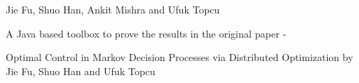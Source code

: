 Jie Fu, Shuo Han, Ankit Mishra and Ufuk Topcu

A Java based toolbox to prove the results in the original paper -\/

Optimal Control in Markov Decision Processes via Distributed Optimization by Jie Fu, Shuo Han and Ufuk Topcu 